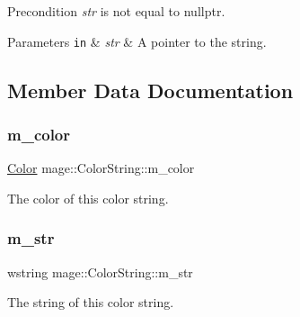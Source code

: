 \begin{DoxyPrecond}{Precondition}
{\itshape str} is not equal to {\ttfamily nullptr}. 
\end{DoxyPrecond}

\begin{DoxyParams}[1]{Parameters}
\mbox{\tt in}  & {\em str} & A pointer to the string. \\
\hline
\end{DoxyParams}


\subsection{Member Data Documentation}
\hypertarget{structmage_1_1_color_string_a3f351c61281fc49786bc13842527d2a3}{}\label{structmage_1_1_color_string_a3f351c61281fc49786bc13842527d2a3} 
\subsubsection{\texorpdfstring{m\+\_\+color}{m\_color}}
{\footnotesize\ttfamily \hyperlink{structmage_1_1_color}{Color} mage\+::\+Color\+String\+::m\+\_\+color\hspace{0.3cm}{\ttfamily [private]}}

The color of this color string. \hypertarget{structmage_1_1_color_string_a9eb840afa5112cd611f5bb1b21edc045}{}\label{structmage_1_1_color_string_a9eb840afa5112cd611f5bb1b21edc045} 
\subsubsection{\texorpdfstring{m\+\_\+str}{m\_str}}
{\footnotesize\ttfamily wstring mage\+::\+Color\+String\+::m\+\_\+str\hspace{0.3cm}{\ttfamily [private]}}

The string of this color string. 